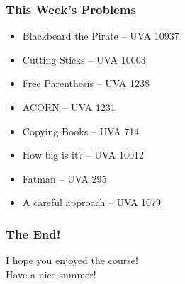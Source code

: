 \begin{frame}
  \frametitle{This Week's Problems}

  \begin{itemize}
  \item Blackbeard the Pirate -- UVA 10937
  \item Cutting Sticks -- UVA 10003
  \item Free Parenthesis -- UVA 1238
  \item ACORN -- UVA 1231
  \item Copying Books -- UVA 714
  \item How big is it? -- UVA 10012
  \item Fatman -- UVA 295
  \item A careful approach -- UVA 1079
  \end{itemize}

\end{frame}

\begin{frame}
  \frametitle{The End!}

  \begin{center}
    I hope you enjoyed the course!\\
    Have a nice summer!
  \end{center}
\end{frame}
